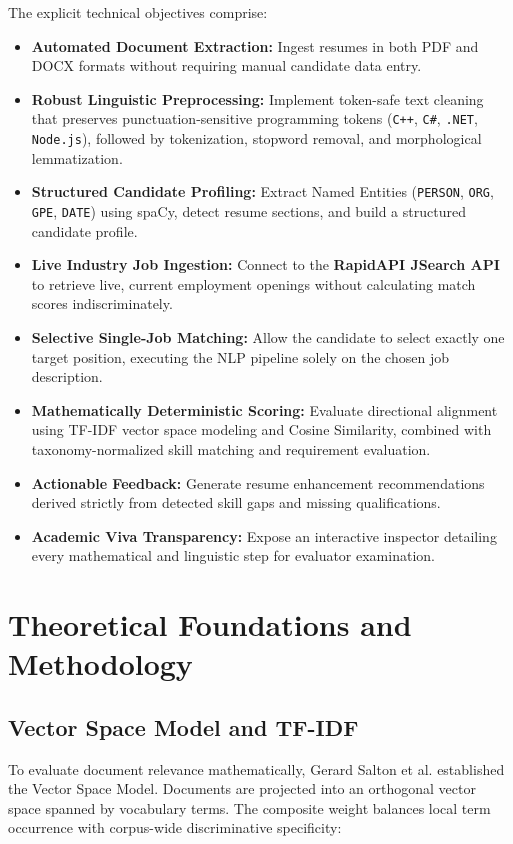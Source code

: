 \documentclass[12pt,a4paper]{report}
\begin{document}
The explicit technical objectives comprise:
\begin{itemize}
    \item \textbf{Automated Document Extraction:} Ingest resumes in both PDF and DOCX formats without requiring manual candidate data entry.
    \item \textbf{Robust Linguistic Preprocessing:} Implement token-safe text cleaning that preserves punctuation-sensitive programming tokens (\texttt{C++}, \texttt{C\#}, \texttt{.NET}, \texttt{Node.js}), followed by tokenization, stopword removal, and morphological lemmatization.
    \item \textbf{Structured Candidate Profiling:} Extract Named Entities (\texttt{PERSON}, \texttt{ORG}, \texttt{GPE}, \texttt{DATE}) using spaCy, detect resume sections, and build a structured candidate profile.
    \item \textbf{Live Industry Job Ingestion:} Connect to the \textbf{RapidAPI JSearch API} to retrieve live, current employment openings without calculating match scores indiscriminately.
    \item \textbf{Selective Single-Job Matching:} Allow the candidate to select exactly one target position, executing the NLP pipeline solely on the chosen job description.
    \item \textbf{Mathematically Deterministic Scoring:} Evaluate directional alignment using TF-IDF vector space modeling and Cosine Similarity, combined with taxonomy-normalized skill matching and requirement evaluation.
    \item \textbf{Actionable Feedback:} Generate resume enhancement recommendations derived strictly from detected skill gaps and missing qualifications.
    \item \textbf{Academic Viva Transparency:} Expose an interactive inspector detailing every mathematical and linguistic step for evaluator examination.
\end{itemize}

\chapter{Theoretical Foundations and Methodology}

\section{Vector Space Model and TF-IDF}
To evaluate document relevance mathematically, Gerard Salton et al. established the Vector Space Model. Documents are projected into an orthogonal vector space spanned by vocabulary terms. The composite weight balances local term occurrence with corpus-wide discriminative specificity:
\end{document}
